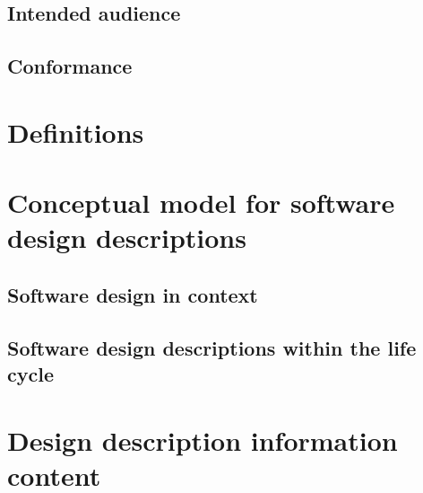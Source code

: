 \documentclass[letterpaper, 10pt, draftclsnofoot, compsoc, onecolumn]{IEEEtran}
\begin{document}
\vspace{1pc}
\subsection{Intended audience}
\vspace{1pc}
{\noindent \par}

\vspace{1pc}
\subsection{Conformance}
\vspace{1pc}
{\noindent \par}




\vspace{1pc}
\section{Definitions}




\vspace{1pc}
\section{Conceptual model for software design descriptions}
\vspace{1pc}
{\noindent \par}


\vspace{1pc}
\subsection{Software design in context}
\vspace{1pc}
{\noindent \par}

\vspace{1pc}
\subsection{Software design descriptions within the life cycle}
\vspace{1pc}
{\noindent \par}



\vspace{1pc}
\section{Design description information content}
\vspace{1pc}
{\noindent \par}
\end{document}
